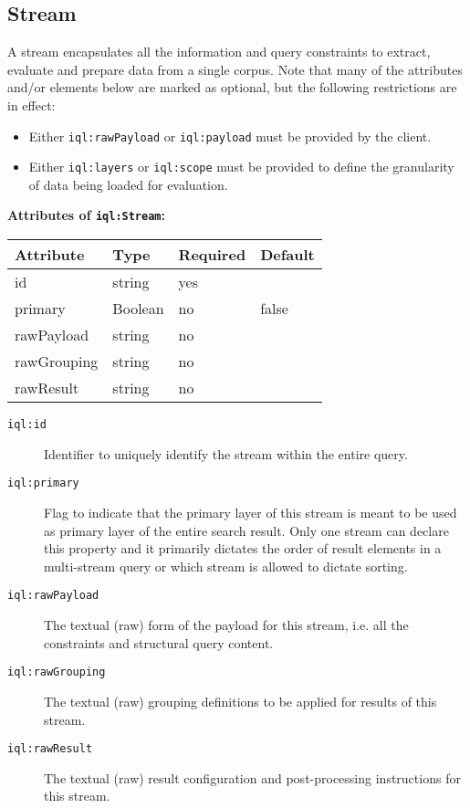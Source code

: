 \documentclass[11pt,a4paper,portrait]{article}
\newcommand{\compresslist}{ %
	\setlength{\topsep}{0pt}
	\setlength{\itemsep}{1pt}
	\setlength{\parskip}{0pt}
	\setlength{\parsep}{0pt}
}
\newcommand{\iqlns}{iql:}
\newcommand{\iqlType}[1]{\texttt{\iqlns#1}}
\newcommand{\desc}[1]{\noindent#1\newline\medskip}
\newenvironment{attributes}[1]{
\noindent\textbf{Attributes of #1:}\newline\medskip
\begin{tabular}{|p{0.3\textwidth}|p{0.20\textwidth}|p{0.20\textwidth}|p{0.17\textwidth}|}
	\hline
	\textbf{Attribute} & \textbf{Type} & \textbf{Required} & \textbf{Default} \\ 
	\hline
	\hline
}{
\end{tabular}
}
\newcommand{\attribute}[4]{
	#1 & #2 & #3 & #4 \\
	\hline
}
\begin{document}
\subsection{Stream}
\label{sec:json-ld-stream}
\desc{A stream encapsulates all the information and query constraints to extract, evaluate and prepare data from a single corpus. Note that many of the attributes and/or elements below are marked as optional, but the following restrictions are in effect:}
\vspace{-\medskipamount}
\begin{itemize}[leftmargin=*,topsep=0pt]\compresslist
	\item Either \iqlType{rawPayload} or \iqlType{payload} must be provided by the client.
	\item Either \iqlType{layers} or \iqlType{scope} must be provided to define the granularity of data being loaded for evaluation.
\end{itemize}
\begin{attributes}{\iqlType{Stream}}
	\attribute{id}{string}{yes}{}
	\attribute{primary}{Boolean}{no}{false}
	\attribute{rawPayload}{string}{no}{}
	\attribute{rawGrouping}{string}{no}{}
	\attribute{rawResult}{string}{no}{}
\end{attributes}
\begin{description}
	\item[\iqlType{id}] Identifier to uniquely identify the stream within the entire query.
	\item[\iqlType{primary}] Flag to indicate that the primary layer of this stream is meant to be used as primary layer of the entire search result. Only one stream can declare this property and it primarily dictates the order of result elements in a multi-stream query or which stream is allowed to dictate sorting.
	\item[\iqlType{rawPayload}] The textual (raw) form of the payload for this stream, i.e. all the constraints and structural query content.
	\item[\iqlType{rawGrouping}] The textual (raw) grouping definitions to be applied for results of this stream.
	\item[\iqlType{rawResult}] The textual (raw) result configuration and post-processing instructions for this stream.
\end{description}
\end{document}
